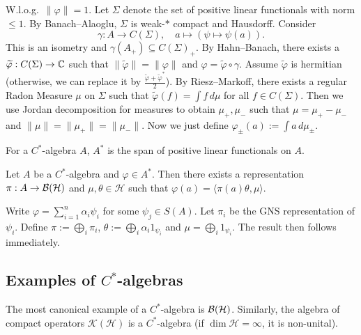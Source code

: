 \begin{myproof}
  W.l.o.g.~$\| \varphi\| = 1$. Let $\Sigma$ denote the set of positive linear functionals with norm $ \leq 1$.
  By Banach--Alaoglu, $\Sigma$ is weak-$*$ compact and Hausdorff.
  Consider $$\gamma: A \to C(\Sigma),\quad a \mapsto (\psi \mapsto \psi(a)).$$
  This is an isometry and $\gamma(A_+) \subseteq C(\Sigma)_+$.
  By Hahn--Banach, there exists a $\widetilde{\varphi}: C(\Sigma) \to \mathbb {C}$ such that $\| \widetilde{\varphi} \| = \| \varphi\|$
  and $\varphi = \widetilde{\varphi} \circ \gamma$.
  Assume $\widetilde{\varphi}$ is hermitian (otherwise, we can replace it by  $\frac{\widetilde{\varphi} + \widetilde{\varphi}^*}{2}$).
  By Riesz--Markoff, there exists a regular Radon Measure $\mu$ on $\Sigma$ such that $\widetilde{\varphi} (f) = \int f\, d\mu$ for all $f \in C(\Sigma)$.
  Then we use Jordan decomposition for measures to obtain $\mu_+, \mu_-$
  such that $\mu = \mu_+ - \mu_-$ and $\| \mu \| = \| \mu_+ \| = \| \mu_- \|$.
  Now we just define $\varphi_{\pm} (a) := \int a \, d\mu_{\pm}$.
\end{myproof}

\begin{corollary}
  For a $C^*$-algebra $A$, $A^*$ is the span of positive linear functionals on $A$.
\end{corollary}

\begin{corollary}
  Let $A$ be a $C^*$-algebra and $\varphi \in A^*$. Then there exists a representation $\pi: A \to \operatorname{\mathcal{B} (\mathcal{H})}$
  and $\mu, \theta \in \mathcal{H}$ such that $\varphi(a) = \langle \pi(a) \theta, \mu \rangle$.
\end{corollary}

\begin{myproof}
  Write $\varphi = \sum_{i = 1} ^n \alpha_i \psi_i$ for some $\psi_j \in S(A)$.
  Let $\pi_i$ be the GNS representation of $\psi_i$. Define $\pi := \bigoplus_i \pi_i$,
  $\theta := \bigoplus_i \alpha_i 1_{\psi_i}$ and $\mu = \bigoplus_i 1_{\psi_i}$.
  The result then follows immediately.
\end{myproof}

\subsection{Examples of $C^*$-algebras}

\begin{example}
  The most canonical example of a $C^*$-algebra is $\operatorname{\mathcal{B} (\mathcal{H})}$.
  Similarly, the algebra of compact operators $\mathcal{K}(\mathcal{H})$ is a $C^*$-algebra 
  (if $\dim \mathcal{H} = \infty$, it is non-unital).
\end{example}

